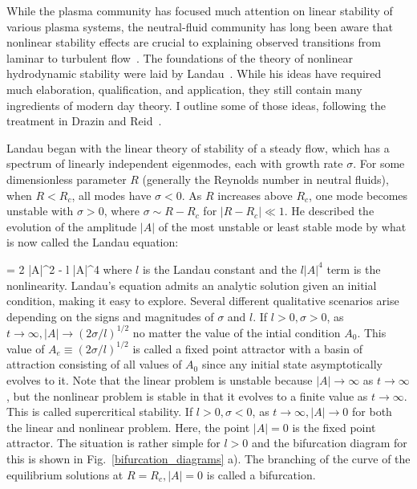 While the plasma community has focused much attention on linear stability of various plasma systems, the neutral-fluid 
community has long been aware that nonlinear stability effects are crucial to explaining observed transitions from laminar to turbulent flow~\cite{krommes1999}.
The foundations of the theory of nonlinear hydrodynamic stability were laid by Landau~\cite{landau1944,landau1959}. While his ideas have required much elaboration, qualification, and application,
they still contain many ingredients of modern day theory. I outline some of those ideas, following the treatment in Drazin and Reid~\cite{drazin1981}.

Landau began with the linear theory of stability of a steady flow, which has a spectrum of linearly independent eigenmodes, each with growth rate $\sigma$. For some dimensionless parameter $R$ 
(generally the Reynolds number in neutral fluids), when $R < R_c$, all modes have $\sigma < 0$. As $R$ increases above $R_c$, one mode becomes unstable with $\sigma > 0$, where 
$\sigma \sim R - R_c$ for $|R-R_c| \ll 1$.
He described the evolution of the amplitude $|A|$ of the most unstable or least stable mode by what is now called the Landau equation:

\beq
\label{landau_eqn}
 = 2 \sigma |A|^2 - l |A|^4
\eeq
where $l$ is the Landau constant and the $l |A|^4$ term is the nonlinearity. Landau's equation admits an analytic solution given an initial condition, making it easy to explore. 
Several different qualitative scenarios arise depending on the signs and magnitudes of $\sigma$ and $l$. If $l>0, \sigma>0$, as $t \rightarrow \infty, |A| \rightarrow (2 \sigma/l)^{1/2}$ no matter
the value of the intial condition $A_0$. This value of $A_e \equiv (2 \sigma/l)^{1/2}$ is called a fixed point attractor with a basin of attraction consisting of all values of $A_0$
since any initial state asymptotically evolves to it. Note that the linear problem
is unstable because $|A| \rightarrow \infty$ as $t \rightarrow \infty$, but the nonlinear problem is stable in that it evolves to a finite value as $t \rightarrow \infty$. This is called
supercritical stability. If $l>0, \sigma<0$, as $t \rightarrow \infty, |A| \rightarrow 0$ for both the linear and nonlinear problem. Here, the point $|A|=0$ is the fixed point attractor. 
The situation is rather simple for
$l>0$ and the bifurcation diagram for this is shown in Fig.~\ref{bifurcation_diagrams} a). The branching of the curve of the equilibrium solutions at $R = R_c, |A| = 0$ is called a bifurcation.

